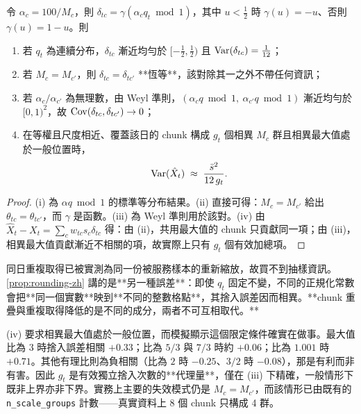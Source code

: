 \documentclass[12pt,a4paper,oneside]{article}
\begin{document}
\begin{proposition}\label{prop:rounding-zh}
令 $\alpha_c=100/M_c$，則 $\delta_{tc}=\gamma(\alpha_c q_t \bmod 1)$，其中 $u<\tfrac12$ 時 $\gamma(u)=-u$、否則 $\gamma(u)=1-u$。則
\begin{enumerate}
\item 若 $q_t$ 為連續分布，$\delta_{tc}$ 漸近均勻於 $[-\tfrac12,\tfrac12)$ 且 $\operatorname{Var}(\delta_{tc})=\tfrac1{12}$；
\item 若 $M_c=M_{c'}$，則 $\delta_{tc}=\delta_{tc'}$ **恆等**，該對除其一之外不帶任何資訊；
\item 若 $\alpha_c/\alpha_{c'}$ 為無理數，由 Weyl 準則，$(\alpha_c q\bmod 1,\ \alpha_{c'}q\bmod 1)$ 漸近均勻於 $[0,1)^2$，故 $\operatorname{Cov}(\delta_{tc},\delta_{tc'})\to 0$；
\item 在等權且尺度相近、覆蓋該日的 chunk 構成 $g_t$ 個相異 $M_c$ 群且相異最大值處於一般位置時，
\begin{equation}
\operatorname{Var}(\hat{X}_t)\;\approx\;\frac{\bar{s}^2}{12\,g_t}.
\label{eq:roundingvar-zh}
\end{equation}
\end{enumerate}
\end{proposition}

\begin{proof}
(i) 為 $\alpha q\bmod 1$ 的標準等分布結果。(ii) 直接可得：$M_c=M_{c'}$ 給出 $\theta_{tc}=\theta_{tc'}$，而 $\gamma$ 是函數。(iii) 為 Weyl 準則用於該對。(iv) 由 $\hat{X}_t-X_t=\sum_c w_{tc}s_c\delta_{tc}$ 得：由 (ii)，共用最大值的 chunk 只貢獻同一項；由 (iii)，相異最大值貢獻漸近不相關的項，故實際上只有 $g_t$ 個有效加總項。
\end{proof}

\begin{remark}
同日重複取得已被實測為同一份被服務樣本的重新縮放，故買不到抽樣資訊。\cref{prop:rounding-zh} 講的是**另一種誤差**：即使 $q_t$ 固定不變，不同的正規化常數會把**同一個實數**映到**不同的整數格點**，其捨入誤差因而相異。**chunk 重疊與重複取得降低的是不同的成分，兩者不可互相取代。**
\end{remark}

\begin{remark}\label{rem:generalposition-zh}
(iv) 要求相異最大值處於一般位置，而模擬顯示這個限定條件確實在做事。最大值比為 $3$ 時捨入誤差相關 $+0.33$；比為 $5/3$ 與 $7/3$ 時約 $+0.06$；比為 $1.001$ 時 $+0.71$。其他有理比則為負相關（比為 $2$ 時 $-0.25$、$3/2$ 時 $-0.08$），那是有利而非有害。因此 $g_t$ 是有效獨立捨入次數的**代理量**，僅在 (iii) 下精確，一般情形下既非上界亦非下界。實務上主要的失效模式仍是 $M_c=M_{c'}$，而該情形已由既有的 \texttt{n\_scale\_groups} 計數——真實資料上 8 個 chunk 只構成 4 群。
\end{remark}
\end{document}
